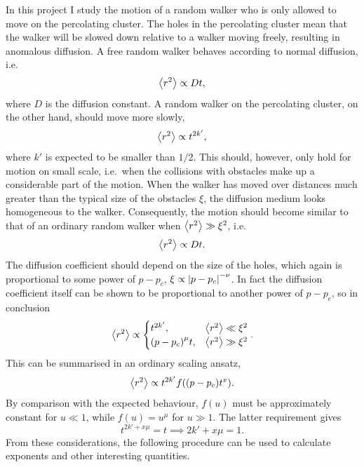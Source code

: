 \documentclass[11pt,british,a4paper]{report}
\begin{document}
In this project I study the motion of a random walker who is only allowed to move on the percolating cluster. The holes in the percolating cluster mean that the walker will be slowed down relative to a walker moving freely, resulting in anomalous diffusion. A free random walker behaves according to normal diffusion, i.e.
\[
    \ev{r^2} \propto Dt,
\]
where \(D\) is the diffusion constant. A random walker on the percolating cluster, on the other hand, should move more slowly,
\[
    \ev{r^2} \propto t^{2k'},
\]
where \(k'\) is expected to be smaller than \(1/2\). This should, however, only hold for motion on small scale, i.e.\ when the collisions with obstacles make up a considerable part of the motion. When the walker has moved over distances much greater than the typical size of the obstacles \(\xi\), the diffusion medium looks homogeneous to the walker. Consequently, the motion should become similar to that of an ordinary random walker when \(\ev{r^2}\gg \xi^2\), i.e.
\[
    \ev{r^2} \propto Dt.
\]
The diffusion coefficient should depend on the size of the holes, which again is proportional to some power of \(p-p_c\), \(\xi \propto \abs{p-p_c}^{-\nu}\). In fact the diffusion coefficient itself can be shown to be proportional to another power of \(p-p_c\), so in conclusion
\[
    \ev{r^2} \propto \begin{cases}
                        t^{2k'}, & \ev{r^2} \ll \xi^2 \\
                        \qty(p-p_c)^\mu t, & \ev{r^2} \gg \xi^2
                     \end{cases}.
\]
This can be summarised in an ordinary scaling ansatz,
\[
    \ev{r^2} \propto t^{2k'} f\qty(\qty(p-p_c)t^x).
\]
By comparison with the expected behaviour, \(f(u)\) must be approximately constant for \(u\ll 1\), while \(f(u)=u^\mu\) for \(u\gg1\). The latter requirement gives
\[
    t^{2k'+ x\mu} = t \implies 2k' + x\mu = 1.
\]
From these considerations, the following procedure can be used to calculate exponents and other interesting quantities.
\end{document}
